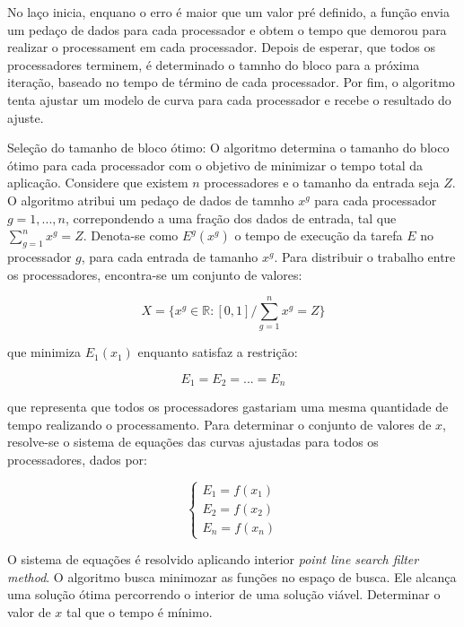 No laço inicia, enquano o erro é maior que um valor pré definido, a função envia um pedaço de dados para cada processador e obtem o tempo que demorou para realizar o processament em cada processador. Depois de esperar, que todos os processadores terminem, é determinado o tamnho do bloco para a próxima iteração, baseado no tempo de término de cada processador. Por fim, o algoritmo tenta ajustar um modelo de curva para cada processador e recebe o resultado do ajuste.

Seleção do tamanho de bloco ótimo: O algoritmo determina o tamanho do bloco ótimo para cada processador com o objetivo de minimizar o  tempo total da aplicação. Considere que existem $n$ processadores e o tamanho da entrada seja $Z$. O algoritmo atribui um pedaço de dados de tamnho $x^g$ para cada processador $g= 1,..., n$, correpondendo a uma fração dos dados de entrada, tal que $\sum_{g=1}^n x^g = Z$. Denota-se como $E^g(x^g)$ o tempo de execução da tarefa $E$ no processador $g$, para cada entrada de tamanho $x^g$. Para distribuir o trabalho entre os processadores, encontra-se um conjunto de valores:

\begin{equation}
	X = \{ x^g \in \mathbb{R}:[0,1] / \sum_{g=1}^n x^g = Z \}
	\label{eq: totalResultado}
\end{equation}

que minimiza $E_1(x_1)$ enquanto satisfaz a restrição:

\begin{equation}
	E_{1} = E_{2} = ...= E_{n}
	\label{eq: Restricao}
\end{equation}
 
que representa que todos os processadores gastariam uma mesma quantidade de tempo realizando o processamento. Para determinar o conjunto de valores de $x$, resolve-se o sistema de equações das curvas ajustadas para todos os processadores, dados por:

\begin{equation}
	\left\lbrace
	\begin{array}{ll}
		\displaystyle E_{1} = f(x_{1})  \\
		\displaystyle E_{2} = f(x_{2})   \\
		\displaystyle E_{n} = f(x_{n}) 
		\label{eq: system}
	\end{array}
	\right.
\end{equation}

O sistema de equações é resolvido aplicando interior \emph{point line search filter method}. O algoritmo busca minimozar as funções no espaço de busca. Ele alcança uma solução ótima percorrendo o interior de uma solução viável. Determinar o valor de $x$ tal que o tempo é mínimo.

